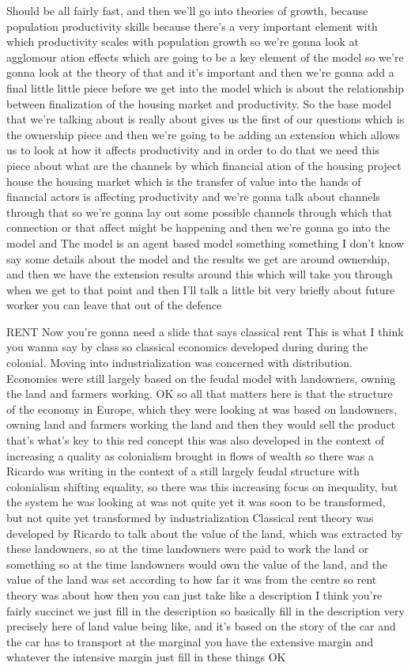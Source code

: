 Should be all fairly fast, and then we’ll go into theories of growth, because population productivity skills because there’s a very important element with which productivity scales with population growth so we’re gonna look at agglomour ation effects which are going to be a key element of the model so we’re gonna look at the theory of that and it’s important and then we’re gonna add a final little little piece before we get into the model which is about the relationship between finalization of the housing market and productivity. So the base model that we’re talking about is really about gives us the first of our questions which is the ownership piece and then we’re going to be adding an extension which allows us to look at how it affects productivity and in order to do that we need this piece about what are the channels by which financial ation of the housing project house the housing market which is the transfer of value into the hands of financial actors is affecting productivity and we’re gonna talk about channels through that so we’re gonna lay out some possible channels through which that connection or that affect might be happening and then we’re gonna go into the model and The model is an agent based model something something I don’t know say some details about the model and the results we get are around ownership, and then we have the extension results around this which will take you through when we get to that point and then I’ll talk a little bit very briefly about future worker you can leave that out of the defence

RENT
Now you’re gonna need a slide that says classical rent
This is what I think you wanna say by class so classical economics developed during during the colonial. Moving into industrialization was concerned with distribution. Economies were still largely based on the feudal model with landowners, owning the land and farmers working.
OK so all that matters here is that the structure of the economy in Europe, which they were looking at was based on landowners, owning land and farmers working the land and then they would sell the product that’s what’s key to this red concept this was also developed in the context of increasing a quality as colonialism brought in flows of wealth so there was a Ricardo was writing in the context of a still largely feudal structure with colonialism shifting equality, so there was this increasing focus on inequality, but the system he was looking at was not quite yet it was soon to be transformed, but not quite yet transformed by industrialization
Classical rent theory was developed by Ricardo to talk about the value of the land, which was extracted by these landowners, so at the time landowners were paid to work the land or something so at the time landowners would own the value of the land, and the value of the land was set according to how far it was from the centre so rent theory was about how then you can just take like a description I think you’re fairly succinct we just fill in the description so basically fill in the description very precisely here of land value being like, and it’s based on the story of the car and the car has to transport at the marginal you have the extensive margin and whatever the intensive margin just fill in these things OK

